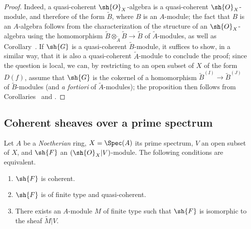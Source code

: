\begin{proof}
Indeed, a quasi-coherent $\sh{O}_X$-algebra is a quasi-coherent $\sh{O}_X$-module, and therefore of the form $\widetilde{B}$, where $B$ is an $A$-module;
the fact that $B$ is an $A$-algebra follows from the characterization of the structure of an $\sh{O}_X$-algebra using the homomorphism $\widetilde{B}\otimes_{\widetilde{A}}\widetilde{B}\to\widetilde{B}$ of $\widetilde{A}$-modules, as well as Corollary~.
If $\sh{G}$ is a quasi-coherent $\widetilde{B}$-module, it suffices to show, in a similar way, that it is also a quasi-coherent $\widetilde{A}$-module to conclude the proof;
since the question is local, we can, by restricting to an open subset of $X$ of the form $D(f)$, assume that $\sh{G}$ is the cokernel of a homomorphism $\widetilde{B}^{(I)}\to\widetilde{B}^{(J)}$ of $\widetilde{B}$-modules (and \emph{a fortiori} of $\widetilde{A}$-modules);
the proposition then follows from Corollaries~ and .
\end{proof}

\subsection{Coherent sheaves over a prime spectrum}
\label{subsection:I.1.5}

\begin{theorem}[1.5.1]
\label{I.1.5.1}
Let $A$ be a \emph{Noetherian} ring, $X=\Spec(A)$ its prime spectrum, $V$ an open subset of $X$, and $\sh{F}$ an $(\sh{O}_X|V)$-module.
The following conditions are equivalent.
\begin{enumerate}
  \item[{\rm(a)}] $\sh{F}$ is coherent.
  \item[{\rm(b)}] $\sh{F}$ is of finite type and quasi-coherent.
  \item[{\rm(c)}] There exists an $A$-module $M$ of finite type such that $\sh{F}$ is isomorphic to the sheaf $\widetilde{M}|V$.
\end{enumerate}
\end{theorem}

